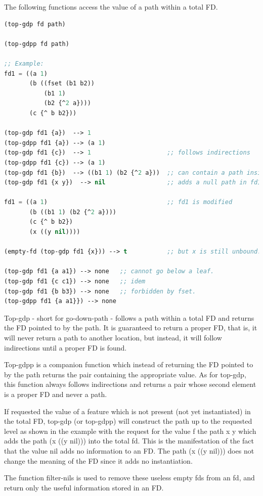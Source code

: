 \documentclass[10pt,a4paper]{report}
\begin{document}
The following functions access the value of a path within a total FD.  
\begin{lstlisting}[language=Lisp]
(top-gdp fd path)

(top-gdpp fd path)

;; Example:
fd1 = ((a 1)
       (b ((fset (b1 b2))
           (b1 1)
           (b2 {^2 a})))
       (c {^ b b2}))

(top-gdp fd1 {a})  --> 1
(top-gdpp fd1 {a}) --> (a 1)
(top-gdp fd1 {c})  --> 1                     ;; follows indirections
(top-gdpp fd1 {c}) --> (a 1)
(top-gdp fd1 {b})  --> ((b1 1) (b2 {^2 a}))  ;; can contain a path inside
(top-gdp fd1 {x y})  --> nil                 ;; adds a null path in fd1

fd1 = ((a 1)                                 ;; fd1 is modified
       (b ((b1 1) (b2 {^2 a})))
       (c {^ b b2})
       (x ((y nil))))

(empty-fd (top-gdp fd1 {x})) --> t           ;; but x is still unbound.

(top-gdp fd1 {a a1}) --> none   ;; cannot go below a leaf.
(top-gdp fd1 {c c1}) --> none   ;; idem
(top-gdp fd1 {b b3}) --> none   ;; forbidden by fset.
(top-gdpp fd1 {a a1}}) --> none 
\end{lstlisting}

Top-gdp - short for go-down-path - follows a path within a total FD and
returns the FD pointed to by the path.  It is guaranteed to return a proper
FD, that is, it will never return a path to another location, but instead,
it will follow indirections until a proper FD is found.  

Top-gdpp is a companion function which instead of returning the FD pointed
to by the path returns the pair containing the appropriate value.  As for
top-gdp, this function always follows indirections and returns a pair whose
second element is a proper FD and never a path.  

If requested the value of a feature which is not present (not yet
instantiated) in the total FD, top-gdp (or top-gdpp) will construct the
path up to the requested level as shown in the example with the request for
the value f the path {x y} which adds the path (x ((y nil))) into the total
fd.  This is the manifestation of the fact that the value nil adds no
information to an FD.  The path (x ((y nil))) does not change the meaning
of the FD since it adds no instantiation.  

The function filter-nils is used to remove these useless empty fds from an
fd, and return only the useful information stored in an FD.
\end{document}
